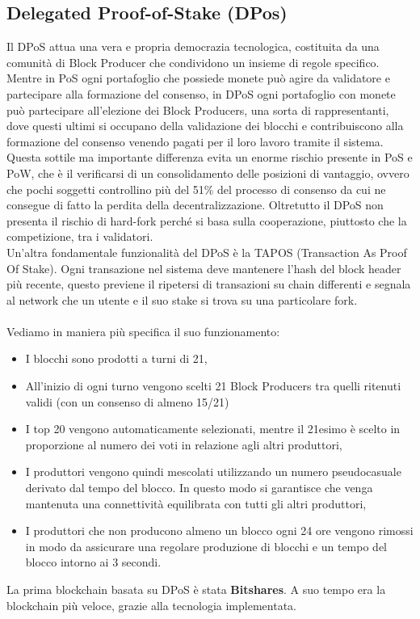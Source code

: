\subsection{Delegated Proof-of-Stake (DPos)}
\label{dpos_marker}
Il DPoS \cite{pisanu2019Ethereum,vitale2018DPOS,ZHANG202093} attua una vera e propria democrazia tecnologica, costituita da una comunità di Block Producer che condividono un insieme di regole specifico.
Mentre in PoS ogni portafoglio che possiede monete può agire da validatore e partecipare alla formazione del consenso, in DPoS ogni portafoglio con monete può partecipare all'elezione dei Block Producers, una sorta di rappresentanti, dove questi ultimi si occupano della validazione dei blocchi e contribuiscono alla formazione del consenso venendo pagati per il loro lavoro tramite il sistema.
Questa sottile ma importante differenza evita un enorme rischio presente in PoS e PoW, che è il verificarsi di un consolidamento delle posizioni di vantaggio, ovvero che pochi soggetti controllino più del 51\% del processo di consenso da cui ne consegue di fatto la perdita della decentralizzazione. Oltretutto il DPoS non presenta il rischio di hard-fork perché si basa sulla cooperazione, piuttosto che la competizione, tra i validatori.
\\
Un'altra fondamentale funzionalità del DPoS è la TAPOS (Transaction As Proof Of Stake). Ogni transazione nel sistema deve mantenere l'hash del block header più recente, questo previene il ripetersi di transazioni su chain differenti e segnala al network che un utente e il suo stake si trova su una particolare fork.
\\
\\
Vediamo in maniera più specifica il suo funzionamento:

\begin{itemize}
    \item I blocchi sono prodotti a turni di 21,
    \item All'inizio di ogni turno vengono scelti 21 Block Producers tra quelli ritenuti validi (con un consenso di almeno 15/21)
    \item I top 20 vengono automaticamente selezionati, mentre il 21esimo è scelto in proporzione al numero dei voti in relazione agli altri produttori,
    \item I produttori vengono quindi mescolati utilizzando un numero pseudocasuale derivato dal tempo del blocco. In questo modo si garantisce che venga mantenuta una connettività equilibrata con tutti gli altri produttori,
    \item I produttori che non producono almeno un blocco ogni 24 ore vengono rimossi in modo da assicurare una regolare produzione di blocchi e un tempo del blocco intorno ai 3 secondi.
\end{itemize}
La prima blockchain basata su DPoS è stata \textbf{Bitshares}. A suo tempo era la blockchain più veloce, grazie alla tecnologia implementata.

